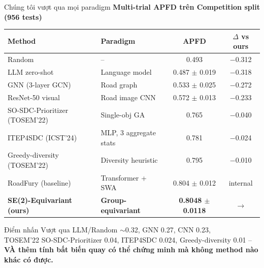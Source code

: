\documentclass[aspectratio=169,10pt]{beamer}
\begin{document}
\begin{frame}{Chúng tôi vượt qua mọi paradigm}
\centering\tiny
\textbf{Multi-trial APFD trên Competition split (956 tests)}\\[0.4em]
\begin{tabular}{l l c c}
  \toprule
  \textbf{Method} & \textbf{Paradigm} & \textbf{APFD} & \textbf{$\Delta$ vs ours} \\
  \midrule
  Random                                & --                          & 0.493             & \textcolor{alert}{$-$0.312} \\
  LLM zero-shot                         & Language model              & 0.487 $\pm$ 0.019 & \textcolor{alert}{$-$0.318} \\
  GNN (3-layer GCN)                     & Road graph                  & 0.533 $\pm$ 0.025 & \textcolor{alert}{$-$0.272} \\
  ResNet-50 visual                      & Road image CNN              & 0.572 $\pm$ 0.013 & \textcolor{alert}{$-$0.233} \\
  SO-SDC-Prioritizer (TOSEM'22)         & Single-obj GA               & 0.765             & \textcolor{alert}{$-$0.040} \\
  ITEP4SDC (ICST'24)                    & MLP, 3 aggregate stats      & 0.781             & \textcolor{alert}{$-$0.024} \\
  Greedy-diversity (TOSEM'22)            & Diversity heuristic         & 0.795             & \textcolor{alert}{$-$0.010} \\
  RoadFury (baseline)                    & Transformer + SWA           & 0.804 $\pm$ 0.012 & internal \\
  \rowcolor{accent!15}
  \textbf{SE(2)-Equivariant (ours)}     & \textbf{Group-equivariant}  & \textbf{0.8048 $\pm$ 0.0118} & \cellcolor{success!15}\textbf{$\rightarrow$} \\
  \bottomrule
\end{tabular}

\vspace{0.7em}
\begin{block}{Điểm nhấn}
\scriptsize
Vượt qua LLM/Random $\sim$0.32, GNN 0.27, CNN 0.23,\\
TOSEM'22 SO-SDC-Prioritizer 0.04, ITEP4SDC 0.024, Greedy-diversity 0.01 --\\
\textbf{VÀ thêm tính bất biến quay có thể chứng minh mà không method nào khác có được.}
\end{block}
\end{frame}
\end{document}
